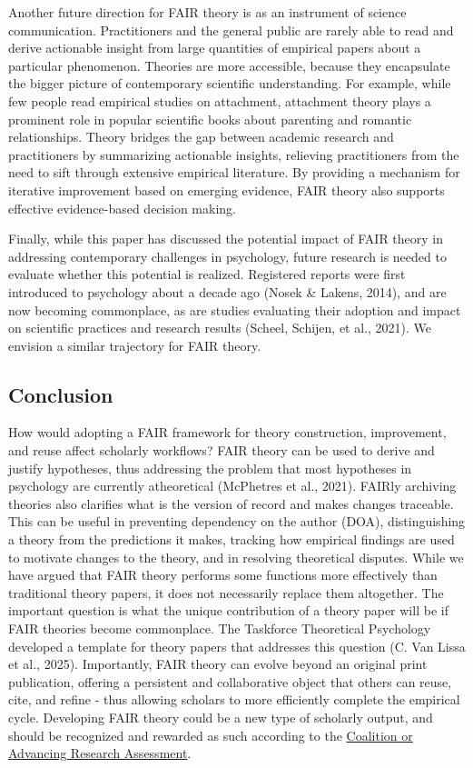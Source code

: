 \documentclass[
  man, noextraspace,floatsintext]{apa7}
\begin{document}
Another future direction for FAIR theory is as an instrument of science communication. Practitioners and the general public are rarely able to read and derive actionable insight from large quantities of empirical papers about a particular phenomenon.
Theories are more accessible, because they encapsulate the bigger picture of contemporary scientific understanding.
For example, while few people read empirical studies on attachment,
attachment theory plays a prominent role in popular scientific books about parenting and romantic relationships.
Theory bridges the gap between academic research and practitioners by summarizing actionable insights, relieving practitioners from the need to sift through extensive empirical literature.
By providing a mechanism for iterative improvement based on emerging evidence, FAIR theory also supports effective evidence-based decision making.

\label{evaluateimpact}{Finally, while this paper has discussed the potential impact of FAIR theory in addressing contemporary challenges in psychology,
future research is needed to evaluate whether this potential is realized.
Registered reports were first introduced to psychology about a decade ago (Nosek \& Lakens, 2014),
and are now becoming commonplace, as are studies evaluating their adoption and impact on scientific practices and research results (Scheel, Schijen, et al., 2021).
We envision a similar trajectory for FAIR theory.}

\subsection{Conclusion}\label{conclusion}

\label{turkheimer}{How would adopting a FAIR framework for theory construction, improvement, and reuse affect scholarly workflows?
FAIR theory can be used to derive and justify hypotheses,
thus addressing the problem that most hypotheses in psychology are currently atheoretical (McPhetres et al., 2021).
FAIRly archiving theories also clarifies what is the version of record and makes changes traceable.
This can be useful in preventing dependency on the author (DOA),
distinguishing a theory from the predictions it makes,
tracking how empirical findings are used to motivate changes to the theory,
and in resolving theoretical disputes.
While we have argued that FAIR theory performs some functions more effectively than traditional theory papers,
it does not necessarily replace them altogether.
The important question is what the unique contribution of a theory paper will be if FAIR theories become commonplace.
The Taskforce Theoretical Psychology developed a template for theory papers that addresses this question (C. Van Lissa et al., 2025).
Importantly, FAIR theory can evolve beyond an original print publication,
offering a persistent and collaborative object that others can reuse, cite, and refine - thus allowing scholars to more efficiently complete the empirical cycle.
Developing FAIR theory could be a new type of scholarly output, and should be recognized and rewarded as such according to the \href{https://coara.org/wp-content/uploads/2022/09/2022_07_19_rra_agreement_final.pdf}{Coalition or Advancing Research Assessment}.}
\end{document}
